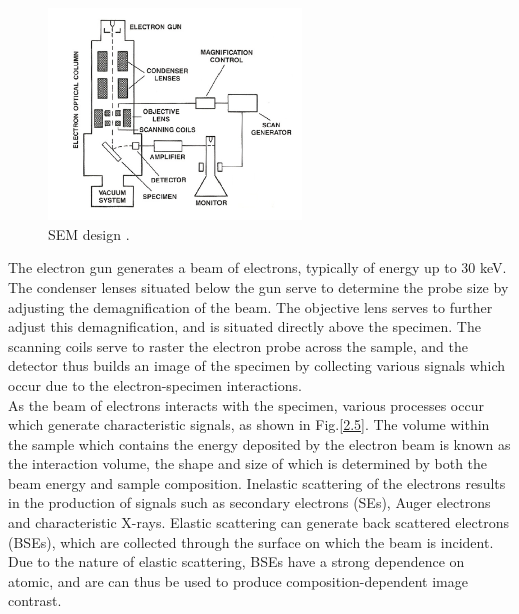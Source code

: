 \begin{figure}[h]
	\centering
	\includegraphics[width=0.6\textwidth]{Figs/Ch2/SEM.png}
	\caption {SEM design \cite{YacobiHolt1990}.}
	\label{2.4}
\end{figure}
\FloatBarrier

The electron gun generates a beam of electrons, typically of energy up to 30 keV. The condenser lenses situated below the gun serve to determine the probe size by adjusting the demagnification of the beam. The objective lens serves to further adjust this demagnification, and is situated directly above the specimen. The scanning coils serve to raster the electron probe across the sample, and the detector thus builds an image of the specimen by collecting various signals which occur due to the electron-specimen interactions.\\
As the beam of electrons interacts with the specimen, various processes occur which generate characteristic signals, as shown in Fig.\ref{2.5}. The volume within the sample which contains the energy deposited by the electron beam is known as the interaction volume, the shape and size of which is determined by both the beam energy and sample composition. Inelastic scattering of the electrons results in the production of signals such as secondary electrons  (SEs), Auger electrons and characteristic X-rays. Elastic scattering can generate back scattered electrons  (BSEs), which are collected through the surface on which the beam is incident. Due to the nature of elastic scattering, BSEs have a strong dependence on atomic, and are can thus be used to produce composition-dependent image contrast.

